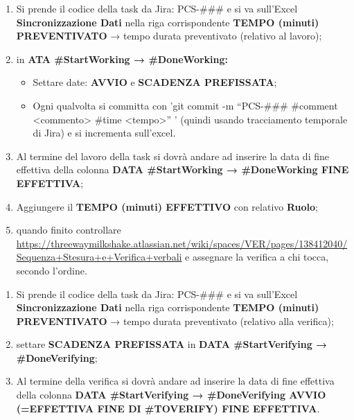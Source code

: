         \begin{enumerate}
        	\item Si prende il codice della task da Jira: PCS-\#\#\# e si va sull’Excel \textbf{Sincronizzazione Dati} nella riga corrispondente \textbf{TEMPO (minuti) PREVENTIVATO} → tempo durata preventivato (relativo al lavoro);
        	\item in \textbf{ATA \#StartWorking → \#DoneWorking: }
        	\begin{itemize}
        		\item Settare date: \textbf{AVVIO} e \textbf{SCADENZA PREFISSATA};
        		\item Ogni qualvolta si committa con 'git commit -m “PCS-\#\#\# \#comment <commento> \#time <tempo>” ' (quindi usando tracciamento temporale di Jira) e si incrementa sull’excel.
        	\end{itemize}
        	\item Al termine del lavoro della task si dovrà andare ad inserire la data di fine effettiva della colonna \textbf{DATA \#StartWorking → \#DoneWorking FINE EFFETTIVA};
        	\item Aggiungere il \textbf{TEMPO (minuti) EFFETTIVO} con relativo \textbf{Ruolo};
        	\item quando finito controllare \url{https://threewaymilkshake.atlassian.net/wiki/spaces/VER/pages/138412040/Sequenza+Stesura+e+Verifica+verbali} e assegnare la verifica a chi tocca, secondo l’ordine.
        \end{enumerate}
    	
    	\begin{enumerate}
    		\item Si prende il codice della task da Jira: PCS-\#\#\# e si va sull’Excel \textbf{Sincronizzazione Dati} nella riga corrispondente \textbf{TEMPO (minuti) PREVENTIVATO} → tempo durata preventivato (relativo alla verifica);
    		\item settare \textbf{SCADENZA PREFISSATA} in \textbf{DATA \#StartVerifying → \#DoneVerifying};
    		\item Al termine della verifica si dovrà andare ad inserire la data di fine effettiva della colonna \textbf{DATA \#StartVerifying → \#DoneVerifying AVVIO (=EFFETTIVA FINE DI \#TOVERIFY) FINE EFFETTIVA}.
    	\end{enumerate}
    
